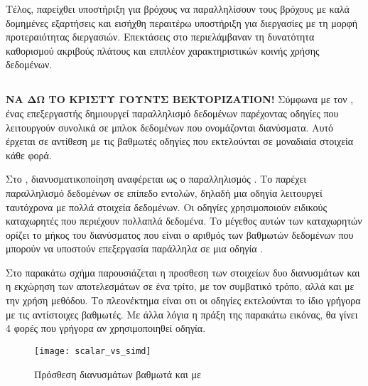 Τέλος, παρείχθει υποστήριξη για βρόχους \emph{} να παραλληλίσουν τους βρόχους με καλά δομημένες εξαρτήσεις και εισήχθη περαιτέρω υποστήριξη για διεργασίες με τη μορφή προτεραιότητας διεργασιών.
Επεκτάσεις στο \emph{} περιελάμβαναν τη δυνατότητα καθορισμού ακριβούς πλάτους \emph{} και επιπλέον
χαρακτηριστικών κοινής χρήσης δεδομένων\cite{pros2}.
\clearpage

\subsection{}
\subparagraph{}

\textbf{ΝΑ ΔΩ ΤΟ ΚΡΙΣΤΥ ΓΟΥΝΤΣ ΒΕΚΤΟΡΙΖΑΤΙΟΝ!}
Σύμφωνα με τον \emph{} \cite{flynn}, ένας επεξεργαστής \emph{} δημιουργεί παραλληλισμό δεδομένων παρέχοντας οδηγίες που λειτουργούν συνολικά σε μπλοκ δεδομένων που ονομάζονται διανύσματα. Αυτό έρχεται σε αντίθεση με τις βαθμωτές οδηγίες που εκτελούνται σε μοναδιαία στοιχεία κάθε φορά.

Στο \emph{}, διανυσματικοποίηση αναφέρεται ως ο παραλληλισμός \emph{}. Το \emph{} παρέχει παραλληλισμό δεδομένων σε επίπεδο εντολών, δηλαδή μια οδηγία λειτουργεί ταυτόχρονα με πολλά στοιχεία δεδομένων. Οι \emph{} οδηγίες χρησιμοποιούν ειδικούς καταχωρητές που περιέχουν πολλαπλά δεδομένα. Το μέγεθος αυτών των καταχωρητών ορίζει το μήκος του διανύσματος που είναι ο αριθμός των βαθμωτών δεδομένων που μπορούν να υποστούν επεξεργασία παράλληλα σε μια οδηγία \emph{}.

Στο παρακάτω σχήμα παρουσιάζεται η προσθεση των στοιχείων δυο διανυσμάτων και η εκχώρηση των αποτελεσμάτων σε ένα τρίτο, με τον συμβατικό τρόπο, αλλά και με την χρήση \emph{} μεθόδου. Το πλεονέκτημα είναι οτι οι \emph{} οδηγίες εκτελούνται το ίδιο γρήγορα με τις αντίστοιχες βαθμωτές. Με άλλα λόγια η πράξη της παρακάτω εικόνας, θα γίνει 4 φορές που γρήγορα αν χρησιμοποιηθεί \emph{} οδηγία.


\begin{figure}[h]
\texttt{[image: scalar\_vs\_simd]}
\centering
\captionsetup{justification=centering, singlelinecheck=false}
	\caption{ Πρόσθεση διανυσμάτων βαθμωτά και με }
\label{fig:scalar_vs_simd}
\end{figure}
\clearpage

